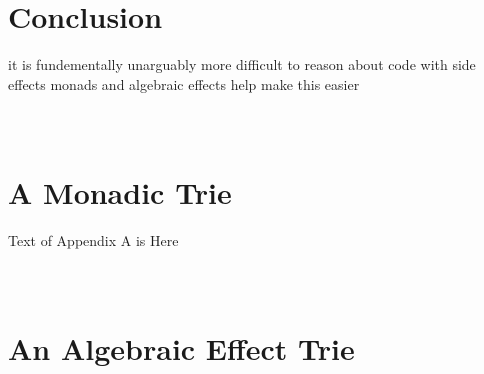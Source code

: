 \documentclass[a4paper,10pt]{article}
\theoremstyle{definition}
\begin{document}
\pagebreak
\tableofcontents

\pagebreak


\pagebreak


\pagebreak


\pagebreak


\pagebreak


\pagebreak
\section{Conclusion}
it is fundementally unarguably more difficult to reason about code with side effects
monads and algebraic effects help make this easier

\pagebreak
\appendix
\section{\\A Monadic Trie}


Text of Appendix A is Here

\section{\\An Algebraic Effect Trie}

\pagebreak


\end{document}
